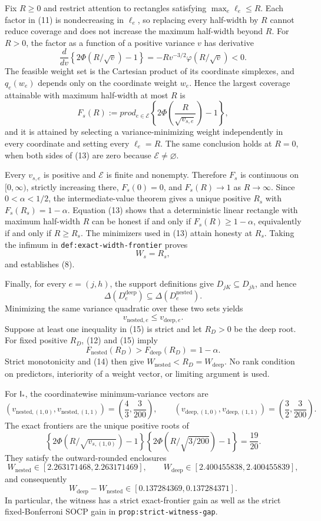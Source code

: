 Fix \(R\geq0\) and restrict attention to rectangles satisfying
\(\max_e\ell_e\leq R\).  Each factor in (11) is nondecreasing in
\(\ell_e\), so replacing every half-width by \(R\) cannot reduce coverage and
does not increase the maximum half-width beyond \(R\).  For \(R>0\), the
factor as a function of a positive variance \(v\) has derivative
\[
 \frac{d}{dv}\left\{2\Phi(R/\sqrt v)-1\right\}
 =-Rv^{-3/2}\varphi(R/\sqrt v)<0. \tag{12}
\]
The feasible weight set is the Cartesian product of its coordinate simplexes,
and \(q_e(w_e)\) depends only on the coordinate weight \(w_e\).  Hence the
largest coverage attainable with maximum half-width at most \(R\) is
\[
 F_s(R):=prod_{e\in\mathcal E}
 \left\{2\Phi\!\left(\frac{R}{\sqrt{v_{s,e}}}\right)-1\right\}, \tag{13}
\]
and it is attained by selecting a variance-minimizing weight independently in
every coordinate and setting every \(\ell_e=R\).  The same conclusion holds
at \(R=0\), when both sides of (13) are zero because
\(\mathcal E\ne\varnothing\).

Every \(v_{s,e}\) is positive and \(\mathcal E\) is finite and nonempty.
Therefore \(F_s\) is continuous on \([0,\infty)\), strictly increasing there,
\(F_s(0)=0\), and \(F_s(R)\to1\) as \(R\to\infty\).  Since
\(0<\alpha<1/2\), the intermediate-value theorem gives a unique positive
\(R_s\) with \(F_s(R_s)=1-\alpha\).  Equation (13) shows that a deterministic
linear rectangle with maximum half-width \(R\) can be honest if and only if
\(F_s(R)\geq1-\alpha\), equivalently if and only if \(R\geq R_s\).  The
minimizers used in (13) attain honesty at \(R_s\).  Taking the infimum in
\texttt{def:exact-width-frontier} proves
\[
 W_s=R_s, \tag{14}
\]
and establishes (8).

Finally, for every \(e=(j,h)\), the support definitions give
\(D_{jK}\subseteq D_{jh}\), and hence
\[
 \Delta(D^{\mathrm{deep}}_e)
 \subseteq\Delta(D^{\mathrm{nested}}_e).
\]
Minimizing the same variance quadratic over these two sets yields
\[
 v_{\mathrm{nested},e}\leq v_{\mathrm{deep},e}. \tag{15}
\]
Suppose at least one inequality in (15) is strict and let \(R_D>0\) be the
deep root.  For fixed positive \(R_D\), (12) and (15) imply
\[
 F_{\mathrm{nested}}(R_D)
 >F_{\mathrm{deep}}(R_D)=1-\alpha.
\]
Strict monotonicity and (14) then give
\(W_{\mathrm{nested}}<R_D=W_{\mathrm{deep}}\).  No rank condition on
predictors, interiority of a weight vector, or limiting argument is used.

For \(\mathsf I_*\), the coordinatewise minimum-variance vectors are
\[
 (v_{\mathrm{nested},(1,0)},v_{\mathrm{nested},(1,1)})
 =\left(\frac43,\frac3{200}\right),
 \qquad
 (v_{\mathrm{deep},(1,0)},v_{\mathrm{deep},(1,1)})
 =\left(\frac32,\frac3{200}\right).
\]
The exact frontiers are the unique positive roots of
\[
 \left\{2\Phi(R/\sqrt{v_{s,(1,0)}})-1\right\}
 \left\{2\Phi(R/\sqrt{3/200})-1\right\}=\frac{19}{20}.
\]
They satisfy the outward-rounded enclosures
\[
 W_{\mathrm{nested}}\in[2.263171468,2.263171469],\qquad
 W_{\mathrm{deep}}\in[2.400455838,2.400455839],
\]
and consequently
\[
 W_{\mathrm{deep}}-W_{\mathrm{nested}}
 \in[0.137284369,0.137284371].
\]
In particular, the witness has a strict exact-frontier gain as well as the
strict fixed-Bonferroni SOCP gain in \texttt{prop:strict-witness-gap}.


